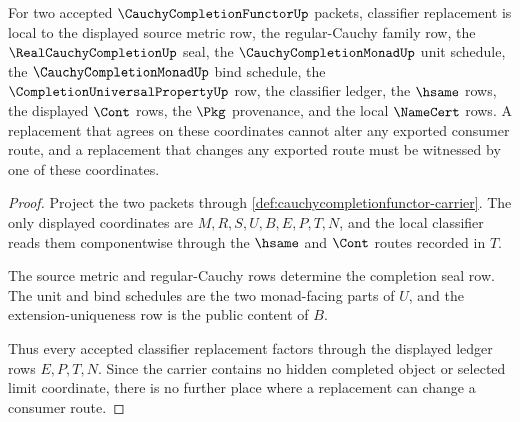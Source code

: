 \begin{theorem}
\label{thm:cauchycompletionfunctor-classifier-transport}
For two accepted $\CauchyCompletionFunctorUp$ packets, classifier replacement is local to the displayed source metric row, the regular-Cauchy family row, the $\RealCauchyCompletionUp$ seal, the $\CauchyCompletionMonadUp$ unit schedule, the $\CauchyCompletionMonadUp$ bind schedule, the $\CompletionUniversalPropertyUp$ row, the classifier ledger, the $\hsame$ rows, the displayed $\Cont$ rows, the $\Pkg$ provenance, and the local $\NameCert$ rows. A replacement that agrees on these coordinates cannot alter any exported consumer route, and a replacement that changes any exported route must be witnessed by one of these coordinates.
\end{theorem}
\begin{proof}
Project the two packets through \autoref{def:cauchycompletionfunctor-carrier}. The only displayed coordinates are $M,R,S,U,B,E,P,T,N$, and the local classifier reads them componentwise through the $\hsame$ and $\Cont$ routes recorded in $T$.

The source metric and regular-Cauchy rows determine the completion seal row. The unit and bind schedules are the two monad-facing parts of $U$, and the extension-uniqueness row is the public content of $B$.

Thus every accepted classifier replacement factors through the displayed ledger rows $E,P,T,N$. Since the carrier contains no hidden completed object or selected limit coordinate, there is no further place where a replacement can change a consumer route.
\end{proof}

